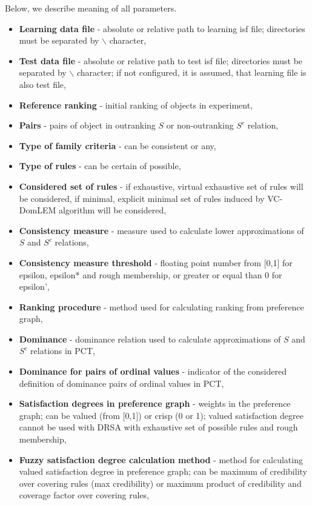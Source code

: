 Below, we describe meaning of all parameters.
\begin{itemize}
	\item \textbf{Learning data file} - absolute or relative path to learning isf file; directories must be separated by $\backslash$ character,
	\item \textbf{Test data file} - absolute or relative path to test isf file; directories must be separated by $\backslash$ character; if not configured, it is assumed, that learning file is also test file,
	\item \textbf{Reference ranking} - initial ranking of objects in experiment,
	\item \textbf{Pairs} - pairs of object in outranking $S$ or non-outranking $S^{c}$ relation,
	\item \textbf{Type of family criteria} - can be consistent or any,
	\item \textbf{Type of rules} - can be certain of possible,
	\item \textbf{Considered set of rules} - if exhaustive, virtual exhaustive set of rules will be considered, if minimal, explicit minimal set of rules induced by VC-DomLEM algorithm will be considered,
	\item \textbf{Consistency measure} - measure used to calculate lower approximations of $S$ and $S^{c}$ relations,
	\item \textbf{Consistency measure threshold} - floating point number from [0,1] for epsilon, epsilon* and rough membership, or greater or equal than 0 for epsilon',
	\item \textbf{Ranking procedure} - method used for calculating ranking from preference graph,
	\item \textbf{Dominance} - dominance relation used to calculate approximations of $S$ and $S^{c}$ relations in PCT,
	\item \textbf{Dominance for pairs of ordinal values} - indicator of the considered definition of dominance pairs of ordinal values in PCT,
	\item \textbf{Satisfaction degrees in preference graph} - weights in the preference graph; can be valued (from [0,1]) or crisp (0 or 1); valued satisfaction degree cannot be used with DRSA with exhaustive set of possible rules and rough membership,
	\item \textbf{Fuzzy satisfaction degree calculation method} - method for calculating valued satisfaction degree in preference graph; can be maximum of credibility over covering rules (max credibility) or maximum product of credibility and coverage factor over covering rules,

\end{itemize}
